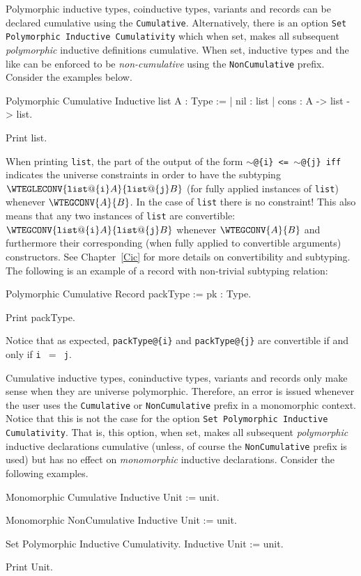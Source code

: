 Polymorphic inductive types, coinductive types, variants and records can be
declared cumulative using the \texttt{Cumulative}. Alternatively,
there is an option \texttt{Set Polymorphic Inductive Cumulativity} which when set,
makes all subsequent \emph{polymorphic} inductive definitions cumulative.  When set,
inductive types and the like can be enforced to be
\emph{non-cumulative} using the \texttt{NonCumulative} prefix. Consider the examples below.
\begin{coq_example*}
Polymorphic Cumulative Inductive list {A : Type} :=
| nil : list
| cons : A -> list -> list.
\end{coq_example*}
\begin{coq_example}
Print list.
\end{coq_example}
When printing \texttt{list}, the part of the output of the form
\texttt{$\mathtt{\sim}$@\{i\} <= $\mathtt{\sim}$@\{j\} iff }
indicates the universe constraints in order to have the subtyping
$\WTEGLECONV{\mathtt{list@\{i\}} A}{\mathtt{list@\{j\}} B}$
(for fully applied instances of \texttt{list}) whenever $\WTEGCONV{A}{B}$.
In the case of \texttt{list} there is no constraint!
This also means that any two instances of \texttt{list} are convertible:
$\WTEGCONV{\mathtt{list@\{i\}} A}{\mathtt{list@\{j\}} B}$ whenever $\WTEGCONV{A}{B}$ and
furthermore their corresponding (when fully applied to convertible arguments) constructors.
See Chapter~\ref{Cic} for more details on convertibility and subtyping.
The following is an example of a record with non-trivial subtyping relation:
\begin{coq_example*}
Polymorphic Cumulative Record packType := {pk : Type}.
\end{coq_example*}
\begin{coq_example}
Print packType.
\end{coq_example}
Notice that as expected, \texttt{packType@\{i\}} and \texttt{packType@\{j\}} are
convertible if and only if \texttt{i $=$ j}.

Cumulative inductive types, coninductive types, variants and records
only make sense when they are universe polymorphic. Therefore, an
error is issued whenever the user uses the \texttt{Cumulative} or
\texttt{NonCumulative} prefix in a monomorphic context.
Notice that this is not the case for the option \texttt{Set Polymorphic Inductive Cumulativity}.
That is, this option, when set, makes all subsequent \emph{polymorphic}
inductive declarations cumulative (unless, of course the \texttt{NonCumulative} prefix is used)
but has no effect on \emph{monomorphic} inductive declarations.
Consider the following examples.
\begin{coq_example}
Monomorphic Cumulative Inductive Unit := unit.
\end{coq_example}
\begin{coq_example}
Monomorphic NonCumulative Inductive Unit := unit.
\end{coq_example}
\begin{coq_example*}
Set Polymorphic Inductive Cumulativity.
Inductive Unit := unit.
\end{coq_example*}
\begin{coq_example}
Print Unit.
\end{coq_example}

